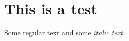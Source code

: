 \documentclass{article}%
\begin{document}
%
\normalsize%
\section{This is a test}%
\label{sec:Thisisatest}%
Some regular text and some%
\textit{italic text. }

%
\end{document}
